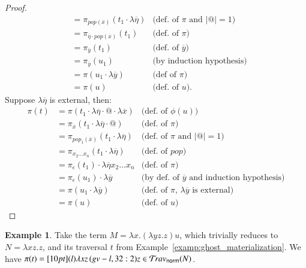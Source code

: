 \documentclass{elsarticle}
\theoremstyle{plain}
\theoremstyle{definition}
\newtheorem{example}{Example}[section]
\newcommand{\normalizing}{{\sf norm}}
\newcommand{\travsetnorm}{\travset_\normalizing} %
\def\coresymbol{\pi} %
\begin{document}
\begin{proof}
\begin{align*}
        &=  \coresymbol_{pop(\overline{x})}(t_1 \cdot
        \lambda\overline{\eta})
            & \mbox{(def.~of $\coresymbol$ and $|@|=1$)}
        \\
        &=  \coresymbol_{\overline\eta \cdot pop(\overline{x})}(t_1)
            & \mbox{(def.~of $\coresymbol$)}
        \\
        &=  \coresymbol_{\overline{y}}(t_1)
            & \mbox{(def.~of $\overline{y}$)}
        \\
        &=  \coresymbol_{\overline{y}}(u_1)
            & \mbox{(by induction hypothesis)}
        \\
        &= \coresymbol(u_1 \cdot \lambda\overline{y}) & \mbox{(def of $\coresymbol$)} \\
        &=  \coresymbol(u)
            & \mbox{(def.~of $u$).}
    \end{align*}
    Suppose $\lambda\overline\eta$ is external, then:
    \begin{align*}
        \coresymbol(t)
        &=  \coresymbol(t_1 \cdot \lambda\overline{\eta} \cdot @ \cdot \lambda\overline{x})
            & \mbox{(def.~of $\phi(u)$)}
        \\
        &=  \coresymbol_{\overline{x}}(t_1 \cdot
        \lambda\overline\eta \cdot @)
            & \mbox{(def.~of $\coresymbol$)}
        \\
        &=  \coresymbol_{pop_1(\overline{x})}(t_1 \cdot \lambda\overline\eta)
            & \mbox{(def.~of $\coresymbol$ and $|@|=1$)}
        \\
        &=  \coresymbol_{x_2\ldots x_n}(t_1 \cdot \lambda\overline\eta)
        & \mbox{(def.~of $pop$)}
        \\
        &=  \coresymbol_{\epsilon}(t_1) \cdot \lambda\overline\eta x_2\ldots x_n
            & \mbox{(def.~of $\coresymbol$)}
        \\
            &= \coresymbol_{\epsilon}(u_1) \cdot \lambda\overline{y}
            & \mbox{(by def.~of $\overline{y}$ and induction hypothesis)}
        \\
        &= \coresymbol(u_1 \cdot \lambda\overline{y})
            & \mbox{(def.~of $\coresymbol$, $\lambda\overline{y}$ is external)}
        \\
        &= \coresymbol(u)
            & \mbox{(def.~of $u$)}
    \end{align*}
\fi
\end{proof}

\begin{example}
    Take the term $M = \lambda x. (\lambda y z.z) u$, which trivially reduces to $N = \lambda x z . z$, and its traversal $t$ from Example~\ref{examp:ghost_materialization}.
    We have $\coresymbol(t) = \Pstr[10pt]{ (l){\lambda x z} \, (gv-l,32:2){z} } \in \travsetnorm(N)$.
\end{example}
\end{document}
